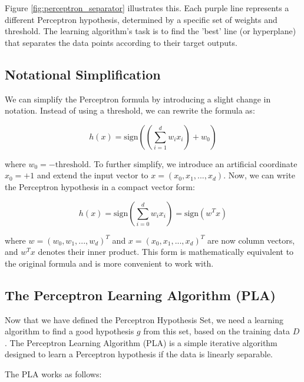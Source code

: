 \documentclass{article}
\begin{document}
Figure \ref{fig:perceptron_separator} illustrates this.  Each purple line represents a different Perceptron hypothesis, determined by a specific set of weights and threshold.  The learning algorithm's task is to find the 'best' line (or hyperplane) that separates the data points according to their target outputs.

\subsection{Notational Simplification}

We can simplify the Perceptron formula by introducing a slight change in notation. Instead of using a \(\text{threshold}\), we can rewrite the formula as:

\[
h(x) = \text{sign} \left( \left( \sum_{i=1}^{d} w_i x_i \right) + w_0 \right)
\]

where \(w_0 = -\text{threshold}\).  To further simplify, we introduce an artificial coordinate \(x_0 = +1\) and extend the input vector to \(x = (x_0, x_1, ..., x_d)\).  Now, we can write the Perceptron hypothesis in a compact vector form:

\[
h(x) = \text{sign} \left( \sum_{i=0}^{d} w_i x_i \right) = \text{sign} (w^T x)
\]

where \(w = (w_0, w_1, ..., w_d)^T\) and \(x = (x_0, x_1, ..., x_d)^T\) are now column vectors, and \(w^T x\) denotes their inner product. This form is mathematically equivalent to the original formula and is more convenient to work with.

\subsection{The Perceptron Learning Algorithm (PLA)}

Now that we have defined the Perceptron Hypothesis Set, we need a learning algorithm to find a good hypothesis \(g\) from this set, based on the training data \(D\).  The Perceptron Learning Algorithm (PLA) is a simple iterative algorithm designed to learn a Perceptron hypothesis if the data is linearly separable.

The PLA works as follows:
\end{document}
